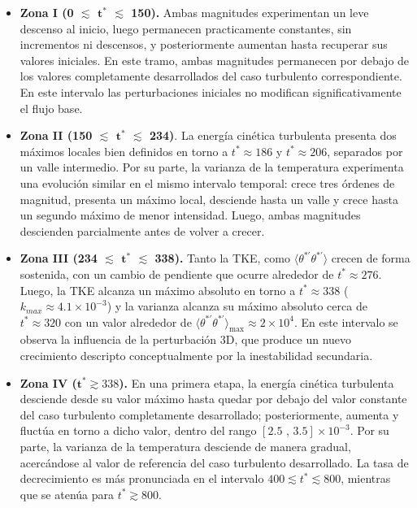 \begin{itemize}
\item \textbf{Zona I (0 $\lesssim$ $\mathbf{t^*}$ $\lesssim$ 150).} Ambas magnitudes experimentan un leve descenso al inicio, luego permanecen practicamente constantes, sin incrementos ni descensos, y posteriormente aumentan hasta recuperar sus valores iniciales. En este tramo, ambas magnitudes permanecen por debajo de los valores completamente desarrollados del caso turbulento correspondiente. En este intervalo las perturbaciones iniciales no modifican significativamente el flujo base.

\item \textbf{Zona II (150 $\lesssim$ $\mathbf{t^*}$ $\lesssim$ 234)}. La energía cinética turbulenta presenta dos máximos locales bien definidos en torno a $t^*\approx186$ y $t^*\approx206$, separados por un valle intermedio. Por su parte, la varianza de la temperatura experimenta una evolución similar en el mismo intervalo temporal: crece tres órdenes de magnitud, presenta un máximo local, desciende hasta un valle y crece hasta un segundo máximo de menor intensidad. Luego, ambas magnitudes descienden parcialmente antes de volver a crecer.

\item \textbf{Zona III (234 $\lesssim$ $\mathbf{t^*}$ $\lesssim$ 338).} Tanto la TKE, como $\langle \theta^{* \prime} \theta^{* \prime} \rangle$ crecen de forma sostenida, con un cambio de pendiente que ocurre alrededor de $t^*\approx276$. Luego, la TKE alcanza un máximo absoluto en torno a $t^*\approx338$ ($k_{max} \approx 4\text{.}1 \times 10^{-3}$) y la varianza alcanza su máximo absoluto cerca de $t^*\approx320$ con un valor alrededor de $\langle \theta^{* \prime} \theta^{* \prime} \rangle_{\text{max}} \approx 2 \times 10^{4}$. En este intervalo se observa la influencia de la perturbación 3D, que produce un nuevo crecimiento descripto conceptualmente por la inestabilidad secundaria.

\item \textbf{Zona IV ($\mathbf{t^*} \gtrsim 338$).} En una primera etapa, la energía cinética turbulenta desciende desde su valor máximo hasta quedar por debajo del valor constante del caso turbulento completamente desarrollado; posteriormente, aumenta y fluctúa en torno a dicho valor, dentro del rango $\left[ 2\text{.}5 \text{ , } 3\text{.}5 \right] \times 10^{-3}$. Por su parte, la varianza de la temperatura desciende de manera gradual, acercándose al valor de referencia del caso turbulento desarrollado. La tasa de decrecimiento es más pronunciada en el intervalo $400 \lesssim t^* \lesssim 800$, mientras que se atenúa para $t^* \gtrsim 800$.
\end{itemize}


